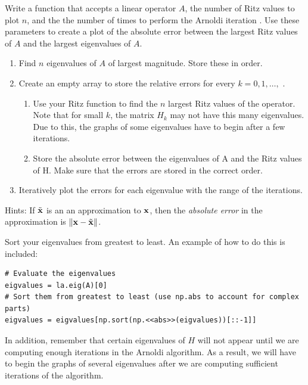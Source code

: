 \begin{problem}
Write a function that accepts a linear operator $A$, the number of Ritz values to plot $n$, and the the number of times to perform the Arnoldi iteration .
Use these parameters to create a plot of the absolute error between the largest Ritz values of $A$ and the largest eigenvalues of $A$.
\begin{enumerate}
    \item Find $n$ eigenvalues of $A$ of largest magnitude. Store these in order.
    \item Create an empty array to store the relative errors for every $k=0,1,\ldots,$ .
    \begin{enumerate}
    	\item Use your Ritz function to find the $n$ largest Ritz values of the operator. Note that for small $k$, the matrix $H_k$ may not have this many eigenvalues. Due to this, the graphs of some eigenvalues have to begin after a few iterations.
        \item Store the absolute error between the eigenvalues of A and the Ritz values of H. Make sure that the errors are stored in the correct order.
    \end{enumerate}
    \item Iteratively plot the errors for each eigenvalue with the range of the iterations.
\end{enumerate}
Hints:
If $\tilde{\mathbf{x}}$ is an an approximation to $\mathbf{x}$, then the \emph{absolute error} in the approximation is $\|\mathbf{x} - \tilde{\mathbf{x}}\|$.

Sort your eigenvalues from greatest to least.
An example of how to do this is included:
\begin{lstlisting}
# Evaluate the eigenvalues
eigvalues = la.eig(A)[0]
# Sort them from greatest to least (use np.abs to account for complex parts)
eigvalues = eigvalues[np.sort(np.<<abs>>(eigvalues))[::-1]]
\end{lstlisting}
In addition, remember that certain eigenvalues of $H$ will not appear until we are computing enough iterations in the Arnoldi algorithm.
As a result, we will have to begin the graphs of several eigenvalues after we are computing sufficient iterations of the algorithm.


\end{problem}
